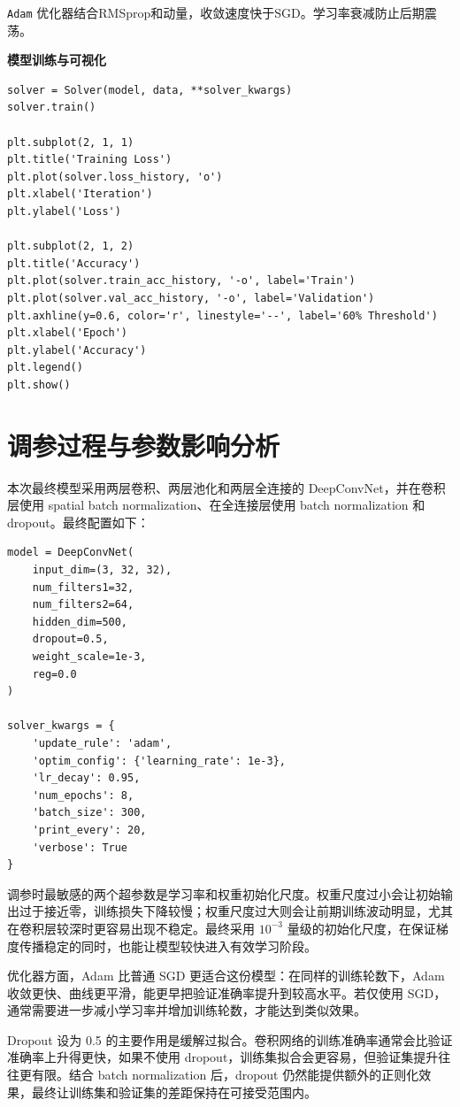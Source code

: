 \lstinline|Adam| 优化器结合RMSprop和动量，收敛速度快于SGD。学习率衰减防止后期震荡。

\textbf{模型训练与可视化}

\begin{lstlisting}[style=cleanpython]
solver = Solver(model, data, **solver_kwargs)
solver.train()

plt.subplot(2, 1, 1)
plt.title('Training Loss')
plt.plot(solver.loss_history, 'o')
plt.xlabel('Iteration')
plt.ylabel('Loss')

plt.subplot(2, 1, 2)
plt.title('Accuracy')
plt.plot(solver.train_acc_history, '-o', label='Train')
plt.plot(solver.val_acc_history, '-o', label='Validation')
plt.axhline(y=0.6, color='r', linestyle='--', label='60% Threshold')
plt.xlabel('Epoch')
plt.ylabel('Accuracy')
plt.legend()
plt.show()
\end{lstlisting}

\section{调参过程与参数影响分析}

本次最终模型采用两层卷积、两层池化和两层全连接的 DeepConvNet，并在卷积层使用 spatial batch normalization、在全连接层使用 batch normalization 和 dropout。最终配置如下：

\begin{lstlisting}[style=cleanpython]
model = DeepConvNet(
    input_dim=(3, 32, 32),
    num_filters1=32,
    num_filters2=64,
    hidden_dim=500,
    dropout=0.5,
    weight_scale=1e-3,
    reg=0.0
)

solver_kwargs = {
    'update_rule': 'adam',
    'optim_config': {'learning_rate': 1e-3},
    'lr_decay': 0.95,
    'num_epochs': 8,
    'batch_size': 300,
    'print_every': 20,
    'verbose': True
}
\end{lstlisting}

调参时最敏感的两个超参数是学习率和权重初始化尺度。权重尺度过小会让初始输出过于接近零，训练损失下降较慢；权重尺度过大则会让前期训练波动明显，尤其在卷积层较深时更容易出现不稳定。最终采用 $10^{-3}$ 量级的初始化尺度，在保证梯度传播稳定的同时，也能让模型较快进入有效学习阶段。

优化器方面，Adam 比普通 SGD 更适合这份模型：在同样的训练轮数下，Adam 收敛更快、曲线更平滑，能更早把验证准确率提升到较高水平。若仅使用 SGD，通常需要进一步减小学习率并增加训练轮数，才能达到类似效果。

Dropout 设为 0.5 的主要作用是缓解过拟合。卷积网络的训练准确率通常会比验证准确率上升得更快，如果不使用 dropout，训练集拟合会更容易，但验证集提升往往更有限。结合 batch normalization 后，dropout 仍然能提供额外的正则化效果，最终让训练集和验证集的差距保持在可接受范围内。

